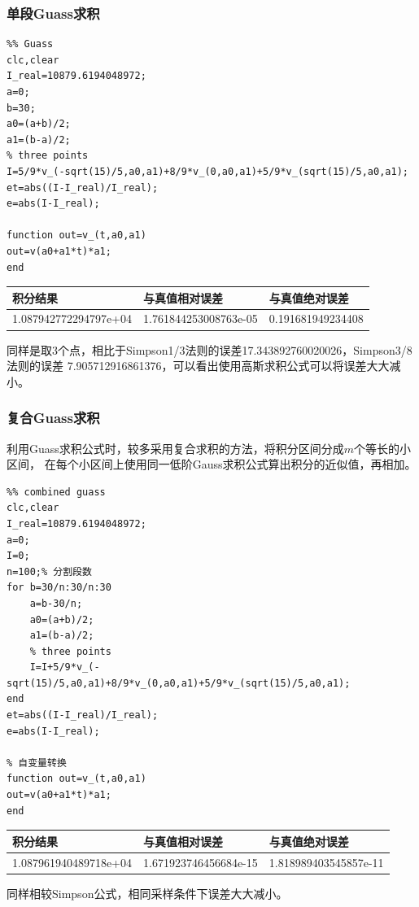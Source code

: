 \documentclass[a4paper,12pt]{ctexart}
\begin{document}
\subsubsection{单段Guass求积}
\begin{lstlisting}
%% Guass
clc,clear
I_real=10879.6194048972;
a=0;
b=30;
a0=(a+b)/2;
a1=(b-a)/2;
% three points
I=5/9*v_(-sqrt(15)/5,a0,a1)+8/9*v_(0,a0,a1)+5/9*v_(sqrt(15)/5,a0,a1);
et=abs((I-I_real)/I_real);
e=abs(I-I_real);

function out=v_(t,a0,a1)
out=v(a0+a1*t)*a1;
end
\end{lstlisting}
\begin{table}[H]
    \centering
    \begin{tabular}{lll}
        \hline
        积分结果              & 与真值相对误差        & 与真值绝对误差    \\ \hline
        1.087942772294797e+04 & 1.761844253008763e-05 & 0.191681949234408 \\ \hline
    \end{tabular}
\end{table}
\par
同样是取3个点，相比于Simpson1/3法则的误差17.343892760020026，Simpson3/8法则的误差
7.905712916861376，可以看出使用高斯求积公式可以将误差大大减小。

\subsubsection{复合Guass求积}
利用Guass求积公式时，较多采用复合求积的方法，将积分区间分成$m$个等长的小区间，
在每个小区间上使用同一低阶Gauss求积公式算出积分的近似值，再相加。
\begin{lstlisting}
%% combined guass
clc,clear
I_real=10879.6194048972;
a=0;
I=0;
n=100;% 分割段数
for b=30/n:30/n:30
    a=b-30/n;
    a0=(a+b)/2;
    a1=(b-a)/2;
    % three points
    I=I+5/9*v_(-sqrt(15)/5,a0,a1)+8/9*v_(0,a0,a1)+5/9*v_(sqrt(15)/5,a0,a1);
end
et=abs((I-I_real)/I_real);
e=abs(I-I_real);

% 自变量转换
function out=v_(t,a0,a1)
out=v(a0+a1*t)*a1;
end
\end{lstlisting}
\begin{table}[H]
    \centering
    \begin{tabular}{lll}
        \hline
        积分结果              & 与真值相对误差        & 与真值绝对误差        \\ \hline
        1.087961940489718e+04 & 1.671923746456684e-15 & 1.818989403545857e-11 \\ \hline
    \end{tabular}
\end{table}
同样相较Simpson公式，相同采样条件下误差大大减小。
\end{document}
